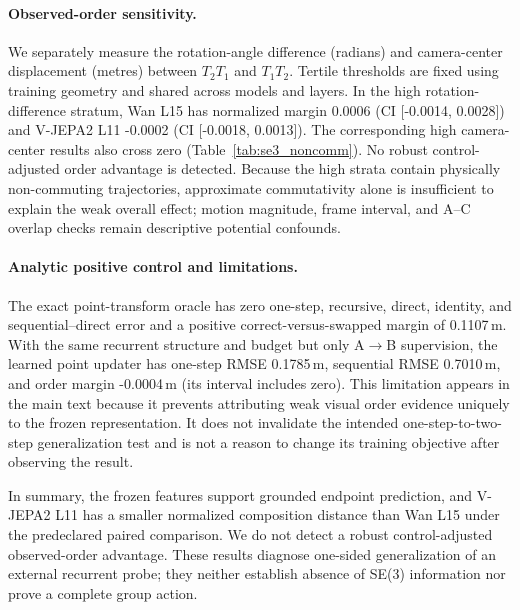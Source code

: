 

\paragraph{Observed-order sensitivity.}
We separately measure the rotation-angle difference (radians) and camera-center displacement (metres) between $T_2T_1$ and $T_1T_2$.  Tertile thresholds are fixed using training geometry and shared across models and layers.  In the high rotation-difference stratum, Wan L15 has normalized margin 0.0006 (CI [-0.0014, 0.0028]) and V-JEPA2 L11 -0.0002 (CI [-0.0018, 0.0013]).  The corresponding high camera-center results also cross zero (Table~\ref{tab:se3_noncomm}).  No robust control-adjusted order advantage is detected.  Because the high strata contain physically non-commuting trajectories, approximate commutativity alone is insufficient to explain the weak overall effect; motion magnitude, frame interval, and A--C overlap checks remain descriptive potential confounds.



\paragraph{Analytic positive control and limitations.}
The exact point-transform oracle has zero one-step, recursive, direct, identity, and sequential--direct error and a positive correct-versus-swapped margin of 0.1107\,m.  With the same recurrent structure and budget but only A$\rightarrow$B supervision, the learned point updater has one-step RMSE 0.1785\,m, sequential RMSE 0.7010\,m, and order margin -0.0004\,m (its interval includes zero).  This limitation appears in the main text because it prevents attributing weak visual order evidence uniquely to the frozen representation.  It does not invalidate the intended one-step-to-two-step generalization test and is not a reason to change its training objective after observing the result.



In summary, the frozen features support grounded endpoint prediction, and V-JEPA2 L11 has a smaller normalized composition distance than Wan L15 under the predeclared paired comparison.  We do not detect a robust control-adjusted observed-order advantage.  These results diagnose one-sided generalization of an external recurrent probe; they neither establish absence of SE(3) information nor prove a complete group action.
